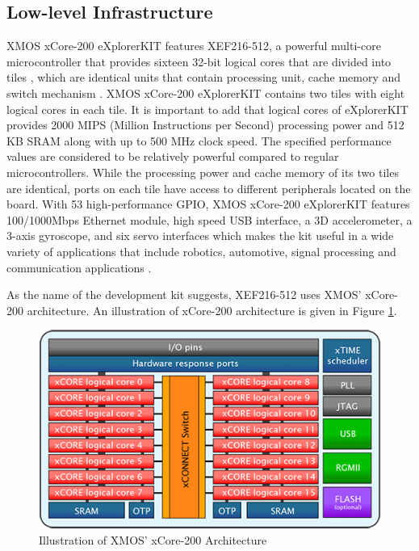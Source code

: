 \subsection{Low-level Infrastructure} \label{lowlevelmoduleinfra}
XMOS xCore-200 eXplorerKIT features XEF216-512, a powerful multi-core microcontroller that provides sixteen 32-bit logical cores that are divided into tiles \cite{xmoskitweb}, which are identical units that contain processing unit, cache memory and switch mechanism \cite{tileref}. XMOS xCore-200 eXplorerKIT contains two tiles with eight logical cores in each tile. It is important to add that logical cores of eXplorerKIT provides 2000 MIPS (Million Instructions per Second) processing power and 512 KB SRAM along with up to 500 MHz clock speed. The specified performance values are considered to be relatively powerful compared to regular microcontrollers. While the processing power and cache memory of its two tiles are identical, ports on each tile have access to different peripherals located on the board. With 53 high-performance GPIO, XMOS xCore-200 eXplorerKIT features 100/1000Mbps Ethernet module, high speed USB interface, a 3D accelerometer, a 3-axis gyroscope, and six servo interfaces which makes the kit useful in a wide variety of applications that include robotics, automotive, signal processing and communication applications \cite{xmoskitweb}.

As the name of the development kit suggests, XEF216-512 uses XMOS' xCore-200 architecture. An illustration of xCore-200 architecture is given in Figure \ref{fig:XE216Architecture}.
\begin{figure}[!ht]
	\centering
	\includegraphics[scale=0.5]{content/images/XE216Architecture.png}
	\caption{Illustration of XMOS' xCore-200 Architecture \cite{xmosflyer}}
	\label{fig:XE216Architecture}
\end{figure}

